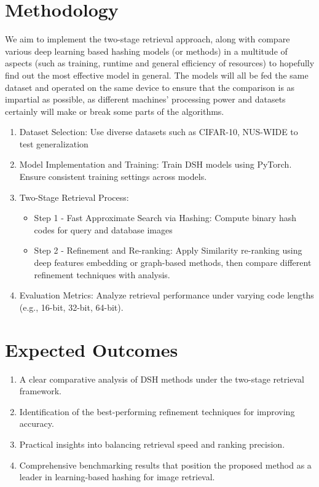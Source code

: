   
\section{Methodology}

We aim to implement the two-stage retrieval approach, along with compare various deep learning based hashing models (or methods) in a multitude of aspects (such as training, runtime and general efficiency of resources) to hopefully find out the most effective model in general.
The models will all be fed the same dataset and operated on the same device to ensure that the comparison is as impartial as possible, as different machines' processing power and datasets certainly will make or break some parts of the algorithms.


\begin{enumerate}
    \item Dataset Selection: Use diverse datasets such as CIFAR-10, NUS-WIDE to test generalization
    \item Model Implementation and Training: Train DSH models using PyTorch. Ensure consistent training settings across models.
    \item Two-Stage Retrieval Process:
    \begin{itemize}
        \item Step 1 - Fast Approximate Search via Hashing: Compute binary hash codes for query and database images
        \item Step 2 - Refinement and Re-ranking: Apply Similarity re-ranking using deep features embedding or graph-based methods, then compare different refinement techniques with analysis.
    \end{itemize}
    \item Evaluation Metrics: Analyze retrieval performance under varying code lengths (e.g., 16-bit, 32-bit, 64-bit).
\end{enumerate}

\section{Expected Outcomes}

\begin{enumerate}
    \item A clear comparative analysis of DSH methods under the two-stage retrieval framework.
    \item Identification of the best-performing refinement techniques for improving accuracy.
    \item Practical insights into balancing retrieval speed and ranking precision.
    \item Comprehensive benchmarking results that position the proposed method as a leader in learning-based hashing for image retrieval.
    
\end{enumerate}